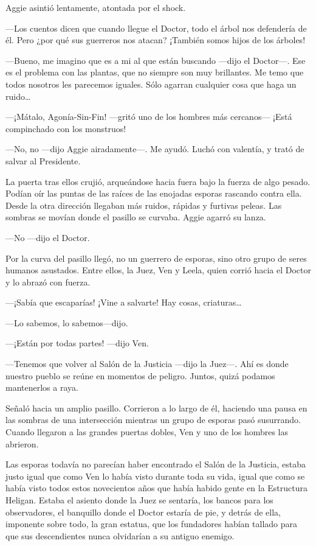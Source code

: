 Aggie asintió lentamente, atontada por el shock.

---Los cuentos dicen que cuando llegue el Doctor, todo el árbol nos
defendería de él. Pero ¿por qué sus guerreros nos atacan? ¡También somos
hijos de los árboles!

---Bueno, me imagino que es a mi al que están buscando ---dijo el
Doctor---. Ese es el problema con las plantas, que no siempre son muy
brillantes. Me temo que todos nosotros les parecemos iguales. Sólo
agarran cualquier cosa que haga un ruido\ldots{}

---¡Mátalo, Agonía-Sin-Fin! ---gritó uno de los hombres más cercanos---
¡Está compinchado con los monstruos!

---No, no ---dijo Aggie airadamente---. Me ayudó. Luchó con valentía, y
trató de salvar al Presidente.

La puerta tras ellos crujió, arqueándose hacia fuera bajo la fuerza de
algo pesado. Podían oír las puntas de las raíces de las enojadas esporas
rascando contra ella. Desde la otra dirección llegaban más ruidos,
rápidas y furtivas peleas. Las sombras se movían donde el pasillo se
curvaba. Aggie agarró su lanza.

---No ---dijo el Doctor.

Por la curva del pasillo llegó, no un guerrero de esporas, sino otro
grupo de seres humanos asustados. Entre ellos, la Juez, Ven y Leela,
quien corrió hacia el Doctor y lo abrazó con fuerza.

---¡Sabía que escaparías! ¡Vine a salvarte! Hay cosas, criaturas\ldots{}

---Lo sabemos, lo sabemos---dijo.

---¡Están por todas partes! ---dijo Ven.

---Tenemos que volver al Salón de la Justicia ---dijo la Juez---. Ahí es
donde nuestro pueblo se reúne en momentos de peligro. Juntos, quizá
podamos mantenerlos a raya.

Señaló hacia un amplio pasillo. Corrieron a lo largo de él, haciendo una
pausa en las sombras de una intersección mientras un grupo de esporas
pasó susurrando. Cuando llegaron a las grandes puertas dobles, Ven y uno
de los hombres las abrieron.

Las esporas todavía no parecían haber encontrado el Salón de la
Justicia, estaba justo igual que como Ven lo había visto durante toda su
vida, igual que como se había visto todos estos novecientos años que
había habido gente en la Estructura Heligan. Estaba el asiento donde la
Juez se sentaría, los bancos para los observadores, el banquillo donde
el Doctor estaría de pie, y detrás de ella, imponente sobre todo, la
gran estatua, que los fundadores habían tallado para que sus
descendientes nunca olvidarían a su antiguo enemigo.


